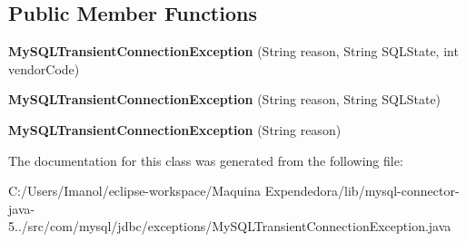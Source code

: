 \subsection*{Public Member Functions}
\begin{DoxyCompactItemize}
\item 
\mbox{\label{classcom_1_1mysql_1_1jdbc_1_1exceptions_1_1_my_s_q_l_transient_connection_exception_aedadc57f882511c05bcea1fe35bd8b0b}} 
{\bfseries My\+S\+Q\+L\+Transient\+Connection\+Exception} (String reason, String S\+Q\+L\+State, int vendor\+Code)
\item 
\mbox{\label{classcom_1_1mysql_1_1jdbc_1_1exceptions_1_1_my_s_q_l_transient_connection_exception_a6fd290b8bad9f8a4af17bc48bb9e2892}} 
{\bfseries My\+S\+Q\+L\+Transient\+Connection\+Exception} (String reason, String S\+Q\+L\+State)
\item 
\mbox{\label{classcom_1_1mysql_1_1jdbc_1_1exceptions_1_1_my_s_q_l_transient_connection_exception_adb767d5e531991a361339ba9376c5c58}} 
{\bfseries My\+S\+Q\+L\+Transient\+Connection\+Exception} (String reason)
\end{DoxyCompactItemize}


The documentation for this class was generated from the following file\+:\begin{DoxyCompactItemize}
\item 
C\+:/\+Users/\+Imanol/eclipse-\/workspace/\+Maquina Expendedora/lib/mysql-\/connector-\/java-\/5../src/com/mysql/jdbc/exceptions/My\+S\+Q\+L\+Transient\+Connection\+Exception.\+java\end{DoxyCompactItemize}
